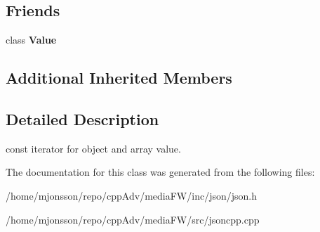 \subsection*{Friends}
\begin{DoxyCompactItemize}
\item 
\mbox{\label{classJson_1_1ValueConstIterator_aeceedf6e1a7d48a588516ce2b1983d6f}} 
class {\bfseries Value}
\end{DoxyCompactItemize}
\subsection*{Additional Inherited Members}


\subsection{Detailed Description}
const iterator for object and array value. 



The documentation for this class was generated from the following files\+:\begin{DoxyCompactItemize}
\item 
/home/mjonsson/repo/cpp\+Adv/media\+F\+W/inc/json/json.\+h\item 
/home/mjonsson/repo/cpp\+Adv/media\+F\+W/src/jsoncpp.\+cpp\end{DoxyCompactItemize}
